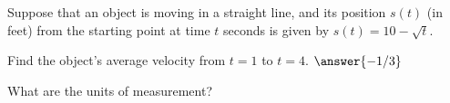 \documentclass{ximera}
\begin{document}
\begin{problem}
  Suppose that an object is moving in a straight line, and its
  position $s(t)$ (in feet) from the starting point at time $t$
  seconds is given by $s(t)=10-\sqrt{t}$.
  \begin{exercise}
    Find the object's average velocity from $t=1$ to
    $t=4$. $\answer{-1/3}$
  \end{exercise}
  \begin{exercise}
    What are the units of measurement?
    \begin{multipleChoice}
    \end{multipleChoice}
  \end{exercise}
\end{problem}
\end{document}
